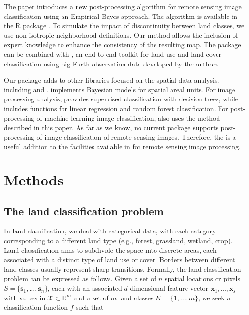 \documentclass[
  shortnames]{jss}
\begin{document}
The paper introduces a new post-processing algorithm for remote sensing image classification using an Empirical Bayes approach. The algorithm is available in the R package . To simulate the impact of discontinuity between land classes, we use non-isotropic neighborhood definitions. Our method allows the inclusion of expert knowledge to enhance the consistency of the resulting map. The  package can be combined with , an end-to-end toolkit for land use and land cover classification using big Earth observation data developed by the authors \citep{Simoes2021}.

Our package adds to other  libraries focused on the spatial data analysis, including  \citep{Bivand2023} and  \citep{Li2022}.  \citep{Lee2013} implements Bayesian models for spatial areal units. For image processing analysis,  \citep{Hijmans2023} provides supervised classification with decision trees, while  \citep{Bivand2023} includes functions for linear regression and random forest classification. For post-processing of machine learning image classification,  also uses the method described in this paper. As far as we know, no current  package supports post-processing of image classification of remote sensing images. Therefore, the  is a useful addition to the facilities available in  for remote sensing image processing.

\newpage

\section{Methods}\label{methods}

\subsection{The land classification problem}\label{the-land-classification-problem}

In land classification, we deal with categorical data, with each category corresponding to a different land type (e.g., forest, grassland, wetland, crop). Land classification aims to subdivide the space into discrete areas, each associated with a distinct type of land use or cover. Borders between different land classes usually represent sharp transitions. Formally, the land classification problem can be expressed as follows. Given a set of \(n\) spatial locations or pixels \(S = \{ \mathbf{s}_1, \ldots, \mathbf{s}_n \}\), each with an associated \(d\)-dimensional feature vector \(\mathbf{x}_1, \ldots, \mathbf{x}_s\) with values in \(\mathcal{X} \subset \mathbb{R}^m\) and a set of \(m\) land classes \(K = \{ 1, ..., m \}\), we seek a classification function \(f\) such that
\end{document}
